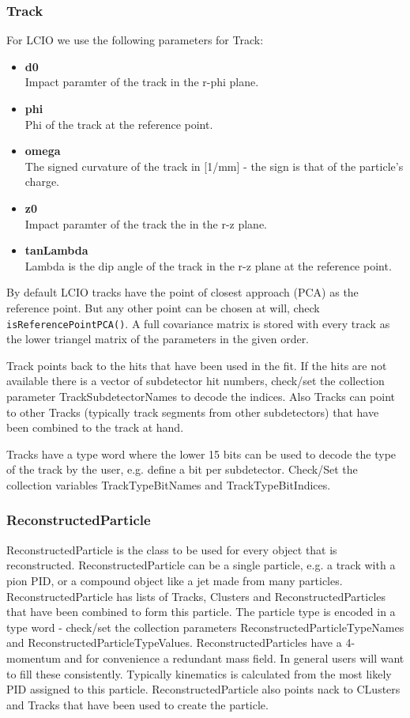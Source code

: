 \documentclass[twoside]{article}
\begin{document}
\subsubsection{Track}
For LCIO we use the following parameters for Track:
\begin{itemize}
\item{{\bf d0}\\
Impact paramter of the track in the r-phi plane.}
\item{{\bf phi}\\
Phi of the track at the reference point.}
\item{{\bf omega}\\
The signed curvature of the track in [1/mm] - the sign is that of the particle's charge.
}
\item{{\bf z0}\\
Impact paramter of the track the in the r-z plane.
}
\item{{\bf tanLambda}\\
Lambda is the dip angle of the track in the r-z plane at the reference point. 
}
\end{itemize}
By default LCIO tracks have the point of closest approach (PCA) as the reference point. But any other point can 
be chosen at will, check \verb$isReferencePointPCA()$.  A full covariance matrix is stored with every track as the
lower triangel matrix of the parameters in the given order.

Track points back to the hits that have been used in the  fit. 
If the hits are not available there is a vector of subdetector hit numbers, check/set the collection parameter
TrackSubdetectorNames to decode the indices. Also Tracks can point to other Tracks (typically track segments from
other subdetectors) that have been combined to the track at hand.

Tracks have a type word where the lower 15 bits can be used to decode the type of the track by the
user, e.g. define a bit per subdetector. Check/Set the collection variables TrackTypeBitNames and 
TrackTypeBitIndices.

\subsubsection{ReconstructedParticle}
ReconstructedParticle is the class to be used for every object that is reconstructed. ReconstructedParticle
can be a single particle, e.g. a track with a pion PID, or a compound object like a jet made from many 
particles.
ReconstructedParticle has lists of Tracks, Clusters and ReconstructedParticles that have been combined to form 
this particle. The particle type  is encoded  in a type word - check/set the collection parameters 
ReconstructedParticleTypeNames and ReconstructedParticleTypeValues.
ReconstructedParticles have a 4-momentum and for convenience a redundant mass field. In general users will 
want to fill these consistently. Typically kinematics is calculated from the most likely PID assigned
to this particle.
ReconstructedParticle also points nack to CLusters and Tracks that have been used to create the particle.
\end{document}

